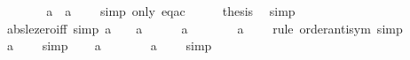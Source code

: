 \begin{isabellebody}
%
\isadelimproof
%
\endisadelimproof
%
\isatagproof
{}\isamarkupfalse%
\ {\isacharminus}{\kern0pt}\isanewline
\ \ \isamarkupfalse%
\ {\isachardoublequoteopen}{}\ {\isacharequal}{\kern0pt}\ {\isasymbar}a{\isasymbar}\ {\isasymlongleftrightarrow}\ {\isasymbar}a{\isasymbar}\ {\isacharequal}{\kern0pt}\ {}{\isachardoublequoteclose}\ \isamarkupfalse%
\ {\isacharparenleft}{\kern0pt}simp\ only{\isacharcolon}{\kern0pt}\ eq{\isacharunderscore}{\kern0pt}ac{\isacharparenright}{\kern0pt}\isanewline
\ \ \isamarkupfalse%
\ \isamarkupfalse%
\ {\isacharquery}{\kern0pt}thesis\ \isamarkupfalse%
\ simp\isanewline
{}\isamarkupfalse%
%
\endisatagproof
{\isafoldproof}%
%
\isadelimproof
\isanewline
%
\endisadelimproof
\isanewline
{}\isamarkupfalse%
\ abs{\isacharunderscore}{\kern0pt}le{\isacharunderscore}{\kern0pt}zero{\isacharunderscore}{\kern0pt}iff\ {\isacharbrackleft}{\kern0pt}simp{\isacharbrackright}{\kern0pt}{\isacharcolon}{\kern0pt}\ {\isachardoublequoteopen}{\isasymbar}a{\isasymbar}\ {\isasymle}\ {}\ {\isasymlongleftrightarrow}\ a\ {\isacharequal}{\kern0pt}\ {}{\isachardoublequoteclose}\isanewline
%
\isadelimproof
%
\endisadelimproof
%
\isatagproof
{}\isamarkupfalse%
\isanewline
\ \ \isamarkupfalse%
\ {\isachardoublequoteopen}{\isasymbar}a{\isasymbar}\ {\isasymle}\ {}{\isachardoublequoteclose}\isanewline
\ \ \isamarkupfalse%
\ \isamarkupfalse%
\ {\isachardoublequoteopen}{\isasymbar}a{\isasymbar}\ {\isacharequal}{\kern0pt}\ {}{\isachardoublequoteclose}\ \isamarkupfalse%
\ {\isacharparenleft}{\kern0pt}rule\ order{\isachardot}{\kern0pt}antisym{\isacharparenright}{\kern0pt}\ simp\isanewline
\ \ \isamarkupfalse%
\ \isamarkupfalse%
\ {\isachardoublequoteopen}a\ {\isacharequal}{\kern0pt}\ {}{\isachardoublequoteclose}\ \isamarkupfalse%
\ simp\isanewline
{}\isamarkupfalse%
\isanewline
\ \ \isamarkupfalse%
\ {\isachardoublequoteopen}a\ {\isacharequal}{\kern0pt}\ {}{\isachardoublequoteclose}\isanewline
\ \ \isamarkupfalse%
\ \isamarkupfalse%
\ {\isachardoublequoteopen}{\isasymbar}a{\isasymbar}\ {\isasymle}\ {}{\isachardoublequoteclose}\ \isamarkupfalse%
\ simp\isanewline
{}\isamarkupfalse%
%
\endisatagproof
{\isafoldproof}%
%

\end{isabellebody}

